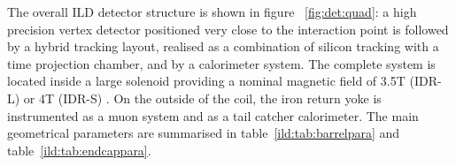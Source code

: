 The overall ILD detector structure is shown in figure ~\ref{fig:det:quad}: a high precision vertex detector positioned very close to the interaction point is followed by a hybrid tracking layout, realised as a combination of silicon tracking with a time projection chamber, and by a calorimeter system. The complete system is located inside a large solenoid providing a nominal magnetic field of 3.5T (IDR-L) or 4T (IDR-S) . On the outside of the coil, the iron return yoke is instrumented as a muon system and as a tail catcher calorimeter. 
The main geometrical parameters are summarised in table~\ref{ild:tab:barrelpara} and table~\ref{ild:tab:endcappara}.
%
%
